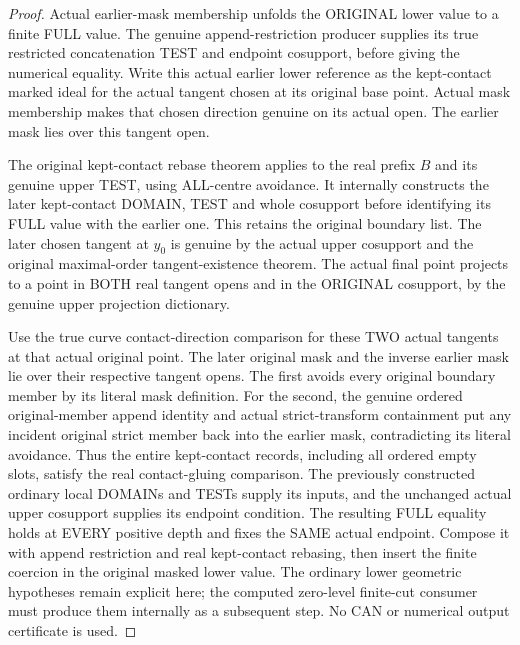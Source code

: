 \begin{proof}
Actual earlier-mask membership unfolds the ORIGINAL lower value to a
finite FULL value. The genuine append-restriction producer supplies its
true restricted concatenation TEST and endpoint cosupport, before giving
the numerical equality. Write this actual earlier lower reference as the
kept-contact marked ideal for the actual tangent chosen at its original
base point. Actual mask membership makes that chosen direction genuine
on its actual open. The earlier mask lies over this tangent open.

The original kept-contact rebase theorem applies to the real prefix $B$
and its genuine upper TEST, using ALL-centre avoidance. It internally
constructs the later kept-contact DOMAIN, TEST and whole cosupport before
identifying its FULL value with the earlier one. This retains the original
boundary list. The later chosen tangent at $y_0$ is genuine by the actual
upper cosupport and the original maximal-order tangent-existence theorem.
The actual final point projects to a point in BOTH real tangent opens and
in the ORIGINAL cosupport, by the genuine upper projection dictionary.

Use the true curve contact-direction comparison for these TWO actual
tangents at that actual original point. The later original mask and the
inverse earlier mask lie over their respective tangent opens. The first
avoids every original boundary member by its literal mask definition.
For the second, the genuine ordered original-member append identity and
actual strict-transform containment put any incident original strict
member back into the earlier mask, contradicting its literal avoidance.
Thus the entire kept-contact records, including all ordered empty slots,
satisfy the real contact-gluing comparison. The previously constructed
ordinary local DOMAINs and TESTs supply its inputs, and the unchanged
actual upper cosupport supplies its endpoint condition. The resulting
FULL equality holds at EVERY positive depth and fixes the SAME actual
endpoint. Compose it with append restriction and real kept-contact
rebasing, then insert the finite coercion in the original masked lower
value. The ordinary lower geometric hypotheses remain explicit here;
the computed zero-level finite-cut consumer must produce them internally
as a subsequent step. No CAN or numerical output certificate is used.
\end{proof}
